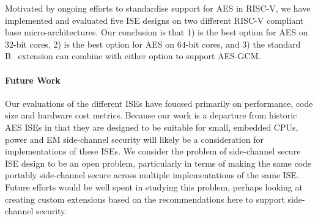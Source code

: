 

Motivated by ongoing efforts to standardise support 
for AES in RISC-V, we have implemented and evaluated five ISE designs 
on two different RISC-V compliant base micro-architectures.
Our conclusion is that
1) 
   is the best option for 
   AES on $32$-bit cores,
2) 
   is the best option for 
   AES on $64$-bit cores,
   and
3) the
   standard 
   B~\cite[Section 17]{RV:ISA:I:19}
   extension
   can combine with either option to support AES-GCM.

\paragraph{Future Work}
Our evaluations of the different ISEs have foucsed primarily on
performance, code size and hardware cost metrics.
Because our work is a departure from historic
AES ISEs in that they are designed to be suitable for small, embedded
CPUs, power and EM side-channel security will likely be a consideration
for implementations of these ISEs.
We consider the problem of side-channel secure ISE design to be an
open problem, particularly in terms of making the same code portably
side-channel secure across multiple implementations of the same ISE.
Future efforts would be well spent in studying this problem, perhaps
looking at creating custom extensions based on the recommendations here
to support side-channel security.

%

